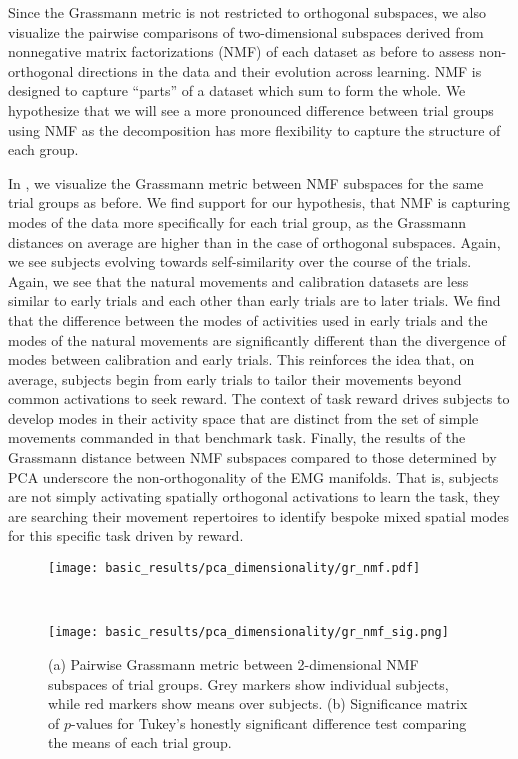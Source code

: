 \documentclass[../main.tex]{subfiles}
\begin{document}
Since the Grassmann metric is not restricted to orthogonal subspaces, we also visualize the pairwise comparisons of two-dimensional subspaces derived from nonnegative matrix factorizations (NMF) of each dataset as before to assess non-orthogonal directions in the data and their evolution across learning. NMF is designed to capture ``parts'' of a dataset which sum to form the whole. We hypothesize that we will see a more pronounced difference between trial groups using NMF as the decomposition has more flexibility to capture the structure of each group.

In , we visualize the Grassmann metric between NMF subspaces for the same trial groups as before. We find support for our hypothesis, that NMF is capturing modes of the data more specifically for each trial group, as the Grassmann distances on average are higher than in the case of orthogonal subspaces. Again, we see subjects evolving towards self-similarity over the course of the trials. Again, we see that the natural movements and calibration datasets are less similar to early trials and each other than early trials are to later trials. We find that the difference between the modes of activities used in early trials and the modes of the natural movements are significantly different than the divergence of modes between calibration and early trials. This reinforces the idea that, on average, subjects begin from early trials to tailor their movements beyond common activations to seek reward. The context of task reward drives subjects to develop modes in their activity space that are distinct from the set of simple movements commanded in that benchmark task. Finally, the results of the Grassmann distance between NMF subspaces compared to those determined by PCA underscore the non-orthogonality of the EMG manifolds. That is, subjects are not simply activating spatially orthogonal activations to learn the task, they are searching their movement repertoires to identify bespoke mixed spatial modes for this specific task driven by reward.

\begin{figure}[!htb]
  \centering
  \begin{minipage}{\textwidth}
    \centering
    \texttt{[image: basic\_results/pca\_dimensionality/gr\_nmf.pdf]}
    \subcaption{}
  \end{minipage}\\%
  \begin{minipage}{\textwidth}
    \centering
    \texttt{[image: basic\_results/pca\_dimensionality/gr\_nmf\_sig.png]}
    \subcaption{}
  \end{minipage}
  \caption[Pairwise Grassmann metric between NMF subspaces]{(a) Pairwise Grassmann metric between 2-dimensional NMF subspaces of trial groups. Grey markers show individual subjects, while red markers show means over subjects. (b) Significance matrix of $p$-values for Tukey's honestly significant difference test comparing the means of each trial group.}\label{fig:grassman_nmf_models}
\end{figure}
\end{document}
